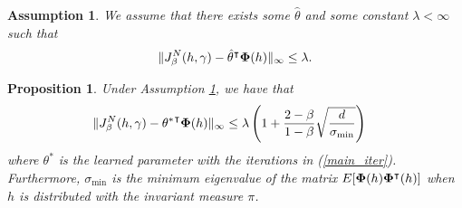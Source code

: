 \documentclass[letterpaper, 10 pt, conference]{ieeeconf}  %
\newtheorem{prop}{Proposition}
\newtheorem{assumption}{Assumption}
\theoremstyle{definition}
\theoremstyle{remark}
\begin{document}
\begin{assumption}\label{near_lin}
We assume that there exists some $\hat{\theta}$ and some constant $\lambda<\infty$ such that 
\begin{align*}
\| J_\beta^N(h,\gamma) - \hat{\theta}^\intercal {\bf \Phi}(h)\|_\infty \leq \lambda. 
\end{align*}
\end{assumption}

\begin{prop}\label{uni_bound}
Under Assumption \ref{near_lin}, we have that 
\begin{align*}
&\|J_\beta^N(h,\gamma) - {\theta^*}^\intercal {\bf \Phi}(h)\|_\infty \leq \lambda \left(1+  \frac{2-\beta}{1-\beta}\sqrt{\frac{d}{\sigma_{\min}}}\right)
\end{align*}
where $\theta^*$ is the learned parameter with the iterations in (\ref{main_iter}). Furthermore,  $\sigma_{\min}$ is the minimum eigenvalue of the matrix $E[{\bf \Phi}(h) {\bf \Phi}^\intercal(h)  ] $ when $h$ is distributed with the invariant measure $\pi$.
\end{prop}
\end{document}

